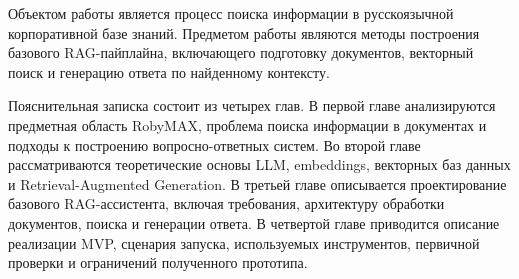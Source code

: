 Объектом работы является процесс поиска информации в русскоязычной корпоративной базе знаний. Предметом работы являются методы построения базового RAG-пайплайна, включающего подготовку документов, векторный поиск и генерацию ответа по найденному контексту.

Пояснительная записка состоит из четырех глав. В первой главе анализируются предметная область RobyMAX, проблема поиска информации в документах и подходы к построению вопросно-ответных систем. Во второй главе рассматриваются теоретические основы LLM, embeddings, векторных баз данных и Retrieval-Augmented Generation. В третьей главе описывается проектирование базового RAG-ассистента, включая требования, архитектуру обработки документов, поиска и генерации ответа. В четвертой главе приводится описание реализации MVP, сценария запуска, используемых инструментов, первичной проверки и ограничений полученного прототипа.


